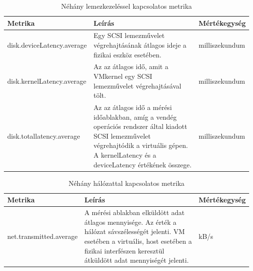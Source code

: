 \documentclass[a4paper,10pt,titlepage]{article}
\begin{document}
\begin{table}[ht]
	\caption{Néhány lemezkezeléssel kapcsolatos metrika}
	\centering
	\small
	\begin{tabular}{| p{3.5cm} | p{7.5cm} | p{2cm} |}
		\hline
		\rowcolor{tc_bone} \textbf{Metrika} & \textbf{Leírás} & \textbf{Mértékegység} \\
		\hline
		disk.deviceLatency.average & Egy SCSI lemezművelet végrehajtásának átlagos ideje a fizikai eszköz esetében. & milliszekundum \\ 
		\hline
		disk.kernelLatency.average & Az az átlagos idő, amit a VMkernel egy SCSI lemezművelet végrehajtásával tölt. & milliszekundum \\ 
		\hline
		disk.totallatency.average & Az az átlagos idő a mérési időablakban, amíg a vendég operációs rendszer által kiadott SCSI lemezművelet végrehajtódik a virtuális gépen. A kernelLatency és a deviceLatency értékének összege. & milliszekundum \\ 
		\hline
	\end{tabular}
	\normalsize
	\label{tab:disk.metrics}
\end{table}
\begin{table}[ht]
	\caption{Néhány hálózattal kapcsolatos metrika}
	\centering
	\small
	\begin{tabular}{| p{3.5cm} | p{7.5cm} | p{2cm} |}
		\hline
		\rowcolor{tc_bone} \textbf{Metrika} & \textbf{Leírás} & \textbf{Mértékegység} \\
		\hline
		net.transmitted.average & A mérési ablakban elküldött adat átlagos mennyisége. Az érték a hálózat sávszélességét jelenti. VM esetében a virtuális, host esetében a fizikai interfészen keresztül átküldött adat mennyiségét jelenti. & kB/s \\ 
		\hline
	\end{tabular}
	\normalsize
	\label{tab:net.metrics}
\end{table}

\clearpage
\end{document}
